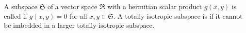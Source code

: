 A subspace $\mathfrak{S}$ of a vector space $\mathfrak{R}$ with a hermitian scalar product $g(x, y)$ is called  if $g(x, y) = 0$ for all $x, y \in \mathfrak{S}$. A totally isotropic subspace is  if it cannot be imbedded in a larger totally isotropic subspace.
